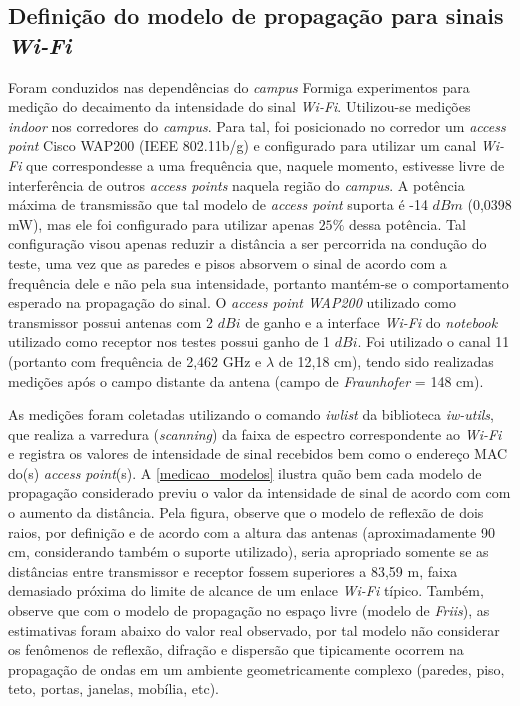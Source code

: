 \documentclass[
	12pt,				%
	twoside,			%
	a4paper,			%
	english,			%
	french,				%
	spanish,			%
	brazil				%
	]{abntex2}
\begin{document}
\subsection{\texorpdfstring{Definição do modelo de propagação para
sinais
\emph{Wi-Fi}}{Definição do modelo de propagação para sinais Wi-Fi}}\label{definiuxe7uxe3o-do-modelo-de-propagauxe7uxe3o-para-sinais-wi-fi}

Foram conduzidos nas dependências do \emph{campus} Formiga experimentos
para medição do decaimento da intensidade do sinal \emph{Wi-Fi}.
Utilizou-se medições \emph{indoor} nos corredores do \emph{campus}. Para
tal, foi posicionado no corredor um \emph{access point} Cisco WAP200
(IEEE 802.11b/g) e configurado para utilizar um canal \emph{Wi-Fi} que
correspondesse a uma frequência que, naquele momento, estivesse livre de
interferência de outros \emph{access points} naquela região do
\emph{campus}. A potência máxima de transmissão que tal modelo de
\emph{access point} suporta é -14 \(dBm\) (0,0398 mW), mas ele foi
configurado para utilizar apenas \(25\%\) dessa potência. Tal
configuração visou apenas reduzir a distância a ser percorrida na
condução do teste, uma vez que as paredes e pisos absorvem o sinal de
acordo com a frequência dele e não pela sua intensidade, portanto
mantém-se o comportamento esperado na propagação do sinal. O
\emph{access point WAP200} utilizado como transmissor possui antenas com
2 \(dBi\) de ganho e a interface \emph{Wi-Fi} do \emph{notebook}
utilizado como receptor nos testes possui ganho de 1 \(dBi\). Foi
utilizado o canal 11 (portanto com frequência de 2,462 GHz e \(\lambda\)
de 12,18 cm), tendo sido realizadas medições após o campo distante da
antena (campo de \emph{Fraunhofer} = 148 cm).

As medições foram coletadas utilizando o comando \emph{iwlist} da
biblioteca \emph{iw-utils}, que realiza a varredura (\emph{scanning}) da
faixa de espectro correspondente ao \emph{Wi-Fi} e registra os valores
de intensidade de sinal recebidos bem como o endereço MAC do(s)
\emph{access point}(s). A \autoref{medicao_modelos} ilustra quão bem
cada modelo de propagação considerado previu o valor da intensidade de
sinal de acordo com com o aumento da distância. Pela figura, observe que
o modelo de reflexão de dois raios, por definição e de acordo com a
altura das antenas (aproximadamente 90 cm, considerando também o suporte
utilizado), seria apropriado somente se as distâncias entre transmissor
e receptor fossem superiores a 83,59 m, faixa demasiado próxima do
limite de alcance de um enlace \emph{Wi-Fi} típico. Também, observe que
com o modelo de propagação no espaço livre (modelo de \emph{Friis}), as
estimativas foram abaixo do valor real observado, por tal modelo não
considerar os fenômenos de reflexão, difração e dispersão que
tipicamente ocorrem na propagação de ondas em um ambiente
geometricamente complexo (paredes, piso, teto, portas, janelas, mobília,
etc).
\end{document}
